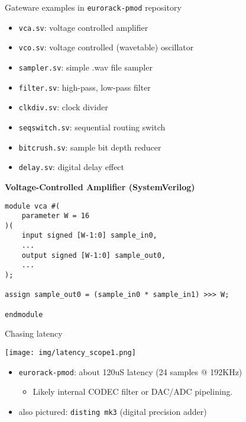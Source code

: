 \documentclass[aspectratio=169]{beamer}
\begin{document}
\begin{frame}{Gateware examples in \texttt{eurorack-pmod} repository}
    \begin{itemize}
        \item \texttt{vca.sv}: voltage controlled amplifier
        \item \texttt{vco.sv}: voltage controlled (wavetable) oscillator
        \item \texttt{sampler.sv}: simple .wav file sampler
        \item \texttt{filter.sv}: high-pass, low-pass filter
        \item \texttt{clkdiv.sv}: clock divider
        \item \texttt{seqswitch.sv}: sequential routing switch
        \item \texttt{bitcrush.sv}: sample bit depth reducer
        \item \texttt{delay.sv}: digital delay effect
    \end{itemize}
\end{frame}

\begin{frame}[fragile]

    \textbf{Voltage-Controlled Amplifier (SystemVerilog)}

    \begin{verbatim}
module vca #(
    parameter W = 16
)(
    input signed [W-1:0] sample_in0,
    ...
    output signed [W-1:0] sample_out0,
    ...
);

assign sample_out0 = (sample_in0 * sample_in1) >>> W;

endmodule
    \end{verbatim}

\end{frame}


\begin{frame}{Chasing latency}
    \begin{center}
        \texttt{[image: img/latency\_scope1.png]}
    \end{center}
    \begin{itemize}
        \item \texttt{eurorack-pmod}: about 120uS latency (24 samples @ 192KHz)
        \begin{itemize}
            \item Likely internal CODEC filter or DAC/ADC pipelining.
        \end{itemize}
        \item also pictured: \texttt{disting mk3} (digital precision adder)
    \end{itemize}
\end{frame}
\end{document}
